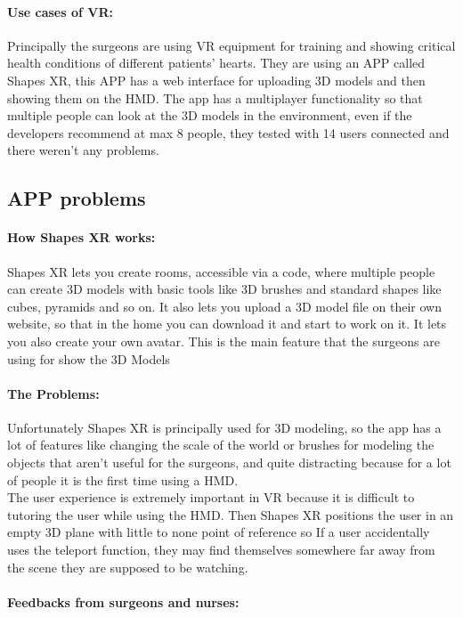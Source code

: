 \paragraph{Use cases of VR:}
Principally the surgeons are using VR equipment for training and showing critical health conditions of different patients' hearts.
They are using an APP called Shapes XR, this APP has a web interface for uploading 3D models and then showing them on the \ac{HMD}.
The app has a multiplayer functionality so that multiple people can look at the 3D models in the environment, even if the developers recommend at max 8 people, they tested with 14 users connected and there weren't any problems.

\subsection{APP problems}

\paragraph{How Shapes XR works:}
Shapes XR lets you create rooms, accessible via a code, where multiple people can create 3D models with basic tools like 3D brushes and standard shapes like cubes, pyramids and so on.
It also lets you upload a 3D model file on their own website, so that in the home you can download it and start to work on it.
It lets you also create your own avatar.
This is the main feature that the surgeons are using for show the 3D Models

\paragraph{The Problems:}
Unfortunately Shapes XR is principally used for 3D modeling, so the app has a lot of features like changing the scale of the world or brushes for modeling the objects that aren't useful for the surgeons,
and quite distracting because for a lot of people it is the first time using a \ac{HMD}.\\
The user experience is extremely important in \ac{VR} because it is difficult to tutoring the user while using the \ac{HMD}.
Then Shapes XR positions the user in an empty 3D plane with little to none point of reference so If a user accidentally uses the teleport function, they may find themselves somewhere far away from the scene they are supposed to be watching.

\paragraph{Feedbacks from surgeons and nurses:}

